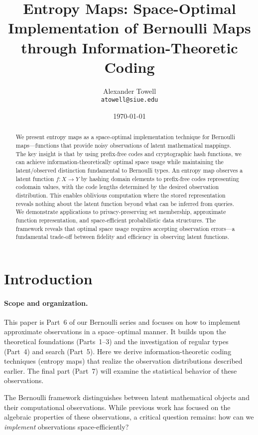 \documentclass[11pt,final,hidelinks]{article}
\title{Entropy Maps: Space-Optimal Implementation of Bernoulli Maps through Information-Theoretic Coding}
\author{
    Alexander Towell\\
    \texttt{atowell@siue.edu}
}
\date{\today}
\begin{document}
\maketitle

\begin{abstract}
We present entropy maps as a space-optimal implementation technique for Bernoulli maps—functions that provide noisy observations of latent mathematical mappings. The key insight is that by using prefix-free codes and cryptographic hash functions, we can achieve information-theoretically optimal space usage while maintaining the latent/observed distinction fundamental to Bernoulli types. An entropy map observes a latent function $f: X \to Y$ by hashing domain elements to prefix-free codes representing codomain values, with the code lengths determined by the desired observation distribution. This enables oblivious computation where the stored representation reveals nothing about the latent function beyond what can be inferred from queries. We demonstrate applications to privacy-preserving set membership, approximate function representation, and space-efficient probabilistic data structures. The framework reveals that optimal space usage requires accepting observation errors—a fundamental trade-off between fidelity and efficiency in observing latent functions.
\end{abstract}

\section{Introduction}

\paragraph{Scope and organization.}  This paper is Part~6 of our Bernoulli series and focuses on how to implement approximate observations in a space–optimal manner.  It builds upon the theoretical foundations (Parts~1--3) and the investigation of regular types (Part~4) and search (Part~5).  Here we derive information-theoretic coding techniques (entropy maps) that realize the observation distributions described earlier.  The final part (Part~7) will examine the statistical behavior of these observations.

The Bernoulli framework distinguishes between latent mathematical objects and their computational observations. While previous work has focused on the algebraic properties of these observations, a critical question remains: how can we \emph{implement} observations space-efficiently?
\end{document}
